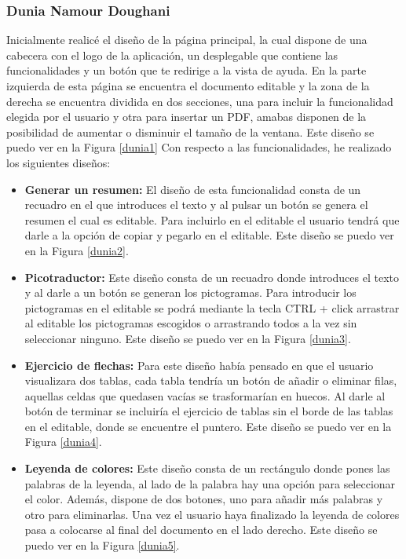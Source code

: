 \subsubsection{Dunia Namour Doughani}
Inicialmente realicé el diseño de la página principal, la cual dispone de una cabecera con el logo de la aplicación, un desplegable que contiene las funcionalidades y un botón que te redirige a la vista de ayuda. En la parte izquierda de esta página se encuentra el documento editable y la zona de la derecha se encuentra dividida en dos secciones, una para incluir la funcionalidad elegida por el usuario y otra para insertar un PDF, amabas disponen de la posibilidad de aumentar o disminuir el tamaño de la ventana. Este diseño se puedo ver en la Figura \ref{dunia1} Con respecto a las funcionalidades, he realizado los siguientes diseños:
\begin{itemize}
  \item \textbf{Generar un resumen:} El diseño de esta funcionalidad consta de un recuadro en el que introduces el texto y al pulsar un botón se genera el resumen el cual es editable. Para incluirlo en el editable el usuario tendrá que darle a la opción de copiar y pegarlo en el editable. Este diseño se puedo ver en la Figura \ref{dunia2}.
  \item \textbf{Picotraductor:} Este diseño consta de un recuadro donde introduces el texto y al darle a un botón se generan los pictogramas. Para introducir los pictogramas en el editable se podrá mediante la tecla CTRL + click arrastrar al editable los pictogramas escogidos o arrastrando todos a la vez sin seleccionar ninguno. Este diseño se puedo ver en la Figura \ref{dunia3}.
  \item \textbf{Ejercicio de flechas:} Para este diseño había pensado en que el usuario visualizara dos tablas, cada tabla tendría un botón de añadir o eliminar filas, aquellas celdas que quedasen vacías se trasformarían en huecos. Al darle al botón de terminar se incluiría el ejercicio de tablas sin el borde de las tablas en el editable, donde se encuentre el puntero. Este diseño se puedo ver en la Figura \ref{dunia4}.
  \item  \textbf{Leyenda de colores:} Este diseño consta de un rectángulo donde pones las palabras de la leyenda, al lado de la palabra hay una opción para seleccionar el color. Además, dispone de dos botones, uno para añadir más palabras y otro para eliminarlas. Una vez el usuario haya finalizado la leyenda de colores pasa a colocarse al final del documento en el lado derecho. Este diseño se puedo ver en la Figura \ref{dunia5}.

\end{itemize}
